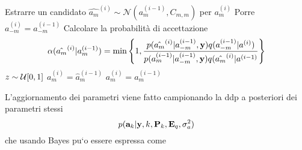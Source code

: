 \begin{algorithmic}
\State Estrarre un candidato $\hat{a_m}^{(i)}\sim\mathcal{N}(a_m^{(i-1)},C_{m,m})$ per $a_m^{(i)}$ 
\State Porre $a_{-m}^{(i)}=a_{-m}^{(i-1)}$
\State Calcolare la probabilità di accettazione
\[
\alpha(\hat{a_m}^{(i)}|a_m^{(i-1)})=\min\left\lbrace 1, \frac{p(\hat{a_m}^{(i)}|a_{-m}^{(i-1)},\textbf{y}) q(a_{-m}^{(i-1)}|a^{(i)})}{p(a_m^{(i-1)}|a_{-m}^{(i-1)},\textbf{y})q(\hat{a_m}^{(i)}|a^{(i-1)}} \right\rbrace
\]
\State $z\sim\mathcal{U}[0,1]$
\State $a_m^{(i)}=\hat{a}_m^{(i-1)}$
\Else $a_m^{(i)}=a_m^{(i-1)}$
\EndIf
\EndFor
\end{algorithmic}
L’aggiornamento dei parametri viene fatto campionando la ddp a posteriori dei
parametri stessi
\begin{equation}
p(\textbf{a}_k|\textbf{y},k,\textbf{P}_k,\textbf{E}_q,\sigma_a^2)
\end{equation}
che usando Bayes pu`o essere espressa come

